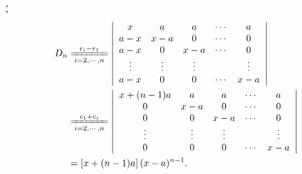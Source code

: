 \begin{frame}

：
  $$
  \begin{aligned}
    D_n 
    &  \xlongequal[i=2,\cd, n]{r_i - r_1} 
    \left|
      \begin{array}{ccccc}
        x   & a   & a    & \cd & a \\
        a-x & x-a & 0    & \cd & 0 \\
        a-x & 0   & x-a  & \cd & 0 \\
        \vd & \vd  & \vd &  & \vd \\
        a-x & 0   & 0    & \cd & x-a 
      \end{array}
    \right| \\
    & \xlongequal[i=2,\cd,n]{c_1+c_i} 
    \left|
      \begin{array}{ccccc}
        x+(n-1)a & a   & a    & \cd & a \\
        0    & x-a & 0    & \cd & 0 \\
        0    & 0   & x-a  & \cd & 0 \\
        \vd & \vd  & \vd &  & \vd \\
        0    & 0   & 0    & \cd & x-a 
      \end{array}
    \right|   \\
    &  =   \left[x+(n-1)a\right](x-a)^{n-1}.
  \end{aligned}
  $$
\end{frame}

